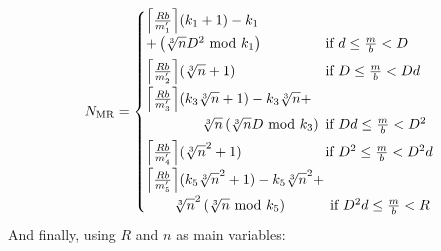 \documentclass[10pt, conference, compsocconf]{IEEEtran}
\DeclarePairedDelimiter{\ceil}{\lceil}{\rceil}
\begin{document}
\begin{equation*}
  N_\mathrm{MR} =
\begin{cases}
  \ceil*{\frac{Rb}{m_1'}}(k_1+1)-k_1 \\
  + \left( \sqrt[3]{n}D^2 \text{ mod } k_1 \right)& \text{\hspace*{-0.9em}if } d \leq \frac{m}{b} < D\\[0.4em]
  
  \ceil*{\frac{Rb}{m_2'}}(\sqrt[3]{n}+1)   & \text{\hspace*{-0.9em}if } D \leq \frac{m}{b} < Dd\\[0.4em]
  
  \ceil*{\frac{Rb}{m_3'}}(k_3\sqrt[3]{n}+1)-k_3\sqrt[3]{n}+\\[0.4em]
  \quad \quad \quad \quad \sqrt[3]{n}\left(\sqrt[3]{n}D\text{ mod } k_3\right)& \text{\hspace*{-0.9em}if } Dd \leq \frac{m}{b} < D^2\\[0.4em]
  \ceil*{\frac{Rb}{m_4'}}(\sqrt[3]{n}^2+1) & \text{\hspace*{-0.9em}if } D^2 \leq \frac{m}{b} < D^2d\\[0.4em]
  \ceil*{\frac{Rb}{m_5'}}(k_5\sqrt[3]{n}^2+1)-k_5\sqrt[3]{n}^2+&\\[0.4em]
  \quad \quad \sqrt[3]{n}^2\left(\sqrt[3]{n} \text{ mod } k_5\right)&\
  \text{\hspace*{-0.9em}if } D^2d \leq \frac{m}{b} < R
\end{cases}
\end{equation*}
And finally, using $R$ and $n$ as main variables:
\end{document}
